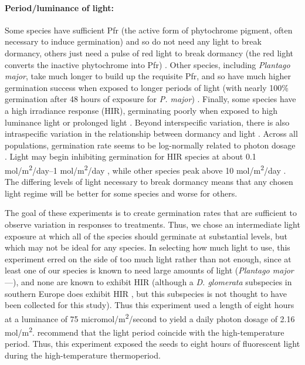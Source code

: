 \documentclass[12pt]{article}\usepackage[]{graphicx}\usepackage[]{color}
\begin{document}
	\paragraph{Period/luminance of light:} Some species have sufficient Pfr (the active form of phytochrome pigment, often necessary to induce germination) and so do not need any light to break dormancy, others just need a pulse of red light to break dormancy (the red light converts the inactive phytochrome into Pfr) \parencite{Casal998}.  Other species, including \textit{Plantago major}, take much longer to build up the requisite Pfr, and so have much higher germination success when exposed to longer periods of light (with nearly 100\% germination after 48 hours of exposure for \textit{P. major}) \parencite{Pons1991}. Finally, some species have a high irradiance response (HIR), germinating poorly when exposed to high luminance light or prolonged light \parencite{Roberts1987}. Beyond interspecific variation, there is also intraspecific variation in the relationship between dormancy and light \parencite{Probert1986}. Across all populations, germination rate seems to be log-normally related to photon dosage \parencite{Ellis1986}. Light may begin inhibiting germination for HIR species at about 0.1 mol/m\textsuperscript{2}/day--1 mol/m\textsuperscript{2}/day \parencite{Baskin1998,Ellis1986}, while other species peak above 10 mol/m\textsuperscript{2}/day \parencite{Ellis1986}. The differing levels of light necessary to break dormancy means that any chosen light regime will be better for some species and worse for others. 
	
	The goal of these experiments is to create germination rates that are sufficient to observe variation in responses to treatments. Thus, we chose an intermediate light exposure at which all of the species should germinate at substantial levels, but which may not be ideal for any species. In selecting how much light to use, this experiment erred on the side of too much light rather than not enough, since at least one of our species is known to need large amounts of light (\textit{Plantago major}---\textcite{Pons1991}), and none are known to exhibit HIR (although a \textit{D. glomerata} subspecies in southern Europe does exhibit HIR \parencite{Probert1986}, but this subspecies is not thought to have been collected for this study). Thus this experiment used a length of eight hours at a luminance of 75 micromol/m\textsuperscript{2}/second to yield a daily photon dosage of 2.16 mol/m\textsuperscript{2}. \textcite{Baskin1998} recommend that the light period coincide with the high-temperature period. Thus, this experiment exposed the seeds to eight hours of fluorescent light during the high-temperature thermoperiod. 
	
\end{document}
